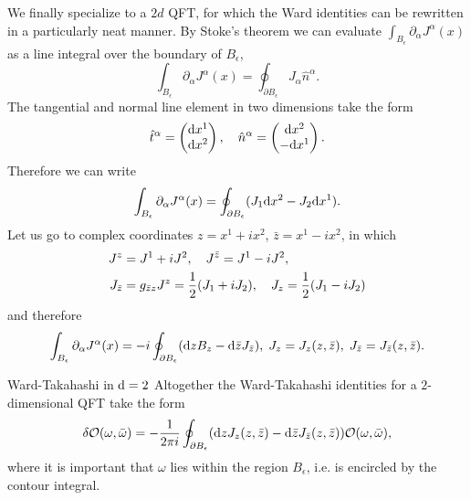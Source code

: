 We finally specialize to a $2d$ QFT, for which the Ward identities can be rewritten in a particularly neat manner. By Stoke's theorem we can evaluate $\int_{B_\epsilon} \partial_\alpha J^\alpha(x)$ as a line integral over the boundary of $B_\epsilon$,
\begin{equation*}
	\int_{B_\epsilon} \partial_\alpha J^\alpha(x)= \oint_{\partial B_\epsilon} J_\alpha \hat{n}^\alpha.
\end{equation*}
The tangential and normal line element in two dimensions take the form
\begin{equation}
\hat{t}^\alpha = \begin{pmatrix}
\mathrm{d} x^1 \\
\mathrm{d} x^2 \\
\end{pmatrix},
\quad 
\hat{n}^\alpha=
\begin{pmatrix}
\mathrm{d} x^2\\
-\mathrm{d} x^1\\
\end{pmatrix}.
\end{equation}
Therefore we can write
\begin{equation}
\int_{B_\epsilon } \partial_\alpha J^\alpha(x) = \oint_{\partial B_\epsilon} (J_1 \mathrm{d} x^2 -J_2 \mathrm{d} x^1).
\end{equation}
Let us go to complex coordinates $z=x^1+ix^2$, $\bar{z}=x^1-i x^2$, in which
\begin{align*}
	J^z &= J^1+i J^2,\quad J^{\bar{ z}} = J^1-iJ^2,\\
	J_{\bar{ z}} &= g_{\bar{ z} z} J^z = \frac{1}{2} (J_1 +iJ_2), \quad J_z = \frac{1}{2} (J_1 -iJ_2)
\end{align*}
and therefore
\begin{equation*}
	\int_{B_\epsilon} \partial_\alpha J^\alpha(x)=-i \oint_{\partial B_\epsilon} (\mathrm{d} z B_z - \mathrm{d} \bar{ z} J_{\bar{ z}}), \; J_z = J_z(z,\bar{ z}), \; J_{\bar{ z}} = J_{\bar{ z}} (z,\bar{ z}).
\end{equation*}
\begin{mybox}{Ward-Takahashi in $\mathrm{d}=2$}
	Altogether the Ward-Takahashi identities for a $2$-dimensional QFT take the form
	\begin{equation}
	\delta \mathcal{O}(\omega,\bar{\omega}) = - \frac{1}{2 \pi i} \oint_{\partial B_\epsilon} (\mathrm{d} z J_z(z,\bar{ z}) - \mathrm{d} \bar{ z} J_{\bar{ z}} (z,\bar{ z})) \mathcal{O}(\omega,\bar{\omega}),
	\end{equation}
	where it is important that $\omega$ lies within the region $B_{\epsilon}$, i.e. is encircled by the contour integral.
	\end{mybox}

